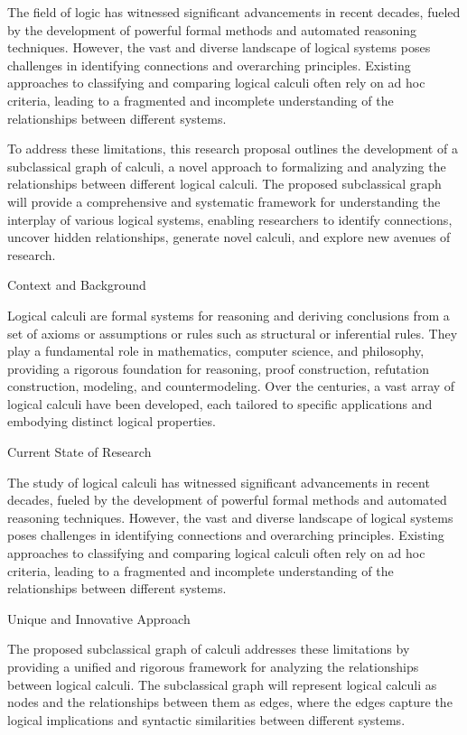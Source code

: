 The field of logic has witnessed significant advancements in recent
decades, fueled by the development of powerful formal methods and
automated reasoning techniques. However, the vast and diverse landscape
of logical systems poses challenges in identifying connections and
overarching principles. Existing approaches to classifying and comparing
logical calculi often rely on ad hoc criteria, leading to a fragmented
and incomplete understanding of the relationships between different
systems.

To address these limitations, this research proposal outlines the
development of a subclassical graph of calculi, a novel approach to
formalizing and analyzing the relationships between different logical
calculi. The proposed subclassical graph will provide a comprehensive
and systematic framework for understanding the interplay of various
logical systems, enabling researchers to identify connections, uncover
hidden relationships, generate novel calculi, and explore new avenues of
research.

Context and Background

Logical calculi are formal systems for reasoning and deriving
conclusions from a set of axioms or assumptions or rules such as
structural or inferential rules. They play a fundamental role in
mathematics, computer science, and philosophy, providing a rigorous
foundation for reasoning, proof construction, refutation construction,
modeling, and countermodeling. Over the centuries, a vast array of
logical calculi have been developed, each tailored to specific
applications and embodying distinct logical properties.

Current State of Research

The study of logical calculi has witnessed significant advancements in
recent decades, fueled by the development of powerful formal methods and
automated reasoning techniques. However, the vast and diverse landscape
of logical systems poses challenges in identifying connections and
overarching principles. Existing approaches to classifying and comparing
logical calculi often rely on ad hoc criteria, leading to a fragmented
and incomplete understanding of the relationships between different
systems.

Unique and Innovative Approach

The proposed subclassical graph of calculi addresses these limitations
by providing a unified and rigorous framework for analyzing the
relationships between logical calculi. The subclassical graph will
represent logical calculi as nodes and the relationships between them as
edges, where the edges capture the logical implications and syntactic
similarities between different systems.

